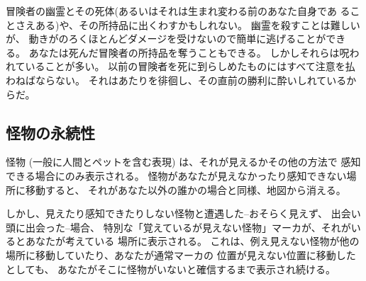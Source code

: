 冒険者の幽霊とその死体(あるいはそれは生まれ変わる前のあなた自身であ
ることさえある)や、その所持品に出くわすかもしれない。
幽霊を殺すことは難しいが、
動きがのろくほとんどダメージを受けないので簡単に逃げることができる。
あなたは死んだ冒険者の所持品を奪うこともできる。
しかしそれらは呪われていることが多い。
以前の冒険者を死に到らしめたものにはすべて注意を払わねばならない。
それはあたりを徘徊し、その直前の勝利に酔いしれているからだ。

\subsection*{怪物の永続性}

怪物 (一般に人間とペットを含む表現) は、それが見えるかその他の方法で
感知できる場合にのみ表示される。
怪物があなたが見えなかったり感知できない場所に移動すると、
それがあなた以外の誰かの場合と同様、地図から消える。

しかし、見えたり感知できたりしない怪物と遭遇した--おそらく見えず、
出会い頭に出会った--場合、
特別な「覚えているが見えない怪物」マーカが、それがいるとあなたが考えている
場所に表示される。
これは、例え見えない怪物が他の場所に移動していたり、あなたが通常マーカの
位置が見えない位置に移動したとしても、
あなたがそこに怪物がいないと確信するまで表示され続ける。

